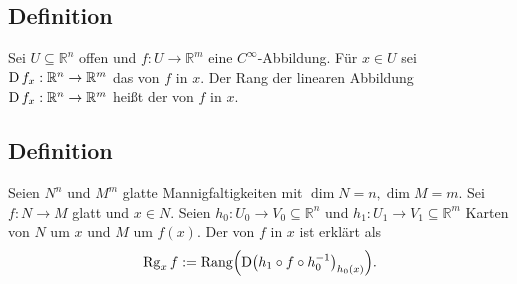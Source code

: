 \subsection[Definition: Rang des Differentials einer $C^\infty$-Abbildung $f : \mathds{R}^m \to \mathds{R}^n$]{Definition} %
\label{sub:162}
Sei $U \subseteq \mathds{R}^n$ offen und $f : U\to \mathds{R}^m$ eine $C^\infty$-Abbildung. Für $x \in U$ sei $\operatorname{D} f_x : \mathbb{R}^n \to \mathbb{R}^m$ das 
 von $f$ in $x$. Der Rang der linearen Abbildung $\operatorname{D} f_x : \mathbb{R}^n \to \mathbb{R}^m$ heißt der  von $f$ in $x$. 

\subsection[Definition: Rang einer $C^\infty$-Abbildung $f : N \to M$]{Definition} %
\label{sub:163}
Seien $N^n$ und $M^m$ glatte Mannigfaltigkeiten mit $\dim N = n, \dim M =m$. Sei $f : N \to M$ glatt und $x \in N$. Seien $h_0 : U_0 \to V_0 \subseteq \mathds{R}^n$ und
$h_1 : U_1 \to V_1 \subseteq \mathds{R}^m$ Karten von $N$ um $x$ und $M$ um $f(x)$. Der  von $f$ in $x$ ist erklärt als 
\[
	\Rg_x f := \mathrm{Rang} \enbrace[\Big]{\D \enbrace*{h_1 \circ f \circ h_0 ^{-1}}_{h_0(x)}} .
\]
